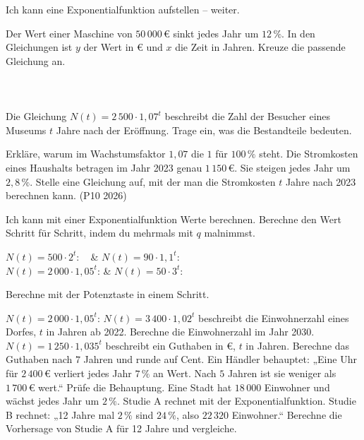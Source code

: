 \begin{aufgabe}{Ich kann eine Exponentialfunktion aufstellen – weiter.}
\begin{teile}
\teil Der Wert einer Maschine von $50\,000\,€$ sinkt jedes Jahr um $12\,\%$. In den Gleichungen ist $y$ der Wert in € und $x$ die Zeit in Jahren. Kreuze die passende Gleichung an. \\
 \\
 \\
 \\
\teil Die Gleichung $N(t) = 2\,500 \cdot 1{,}07^t$ beschreibt die Zahl der Besucher eines Museums $t$ Jahre nach der Eröffnung. Trage ein, was die Bestandteile bedeuten.
\end{teile}
\begin{teile}
\teil Erkläre, warum im Wachstumsfaktor $1{,}07$ die $1$ für $100\,\%$ steht.
\teil Die Stromkosten eines Haushalts betragen im Jahr 2023 genau $1\,150\,€$. Sie steigen jedes Jahr um $2{,}8\,\%$. Stelle eine Gleichung auf, mit der man die Stromkosten $t$ Jahre nach 2023 berechnen kann. (P10 2026)
\end{teile}
\end{aufgabe}

\begin{aufgabe}{Ich kann mit einer Exponentialfunktion Werte berechnen. Berechne den Wert Schritt für Schritt, indem du mehrmals mit $q$ malnimmst.}
\begin{teilezwei}
\tz $N(t) = 500 \cdot 2^t$: \  & \tz $N(t) = 90 \cdot 1{,}1^t$: \  \\
\tz $N(t) = 2\,000 \cdot 1{,}05^t$:  & \tz $N(t) = 50 \cdot 3^t$: \  \\
\end{teilezwei}
Berechne mit der Potenztaste in einem Schritt.
\begin{teile}
\teil $N(t) = 2\,000 \cdot 1{,}05^t$: \quad {}
\teil $N(t) = 3\,400 \cdot 1{,}02^t$ beschreibt die Einwohnerzahl eines Dorfes, $t$ in Jahren ab 2022. Berechne die Einwohnerzahl im Jahr 2030. \quad \leerfeld
\teil $N(t) = 1\,250 \cdot 1{,}035^t$ beschreibt ein Guthaben in €, $t$ in Jahren. Berechne das Guthaben nach $7$ Jahren und runde auf Cent. \quad \leerfeld[€]
\teil Ein Händler behauptet: „Eine Uhr für $2\,400\,€$ verliert jedes Jahr $7\,\%$ an Wert. Nach $5$ Jahren ist sie weniger als $1\,700\,€$ wert.“ Prüfe die Behauptung.
\teil Eine Stadt hat $18\,000$ Einwohner und wächst jedes Jahr um $2\,\%$. Studie A rechnet mit der Exponentialfunktion. Studie B rechnet: „12 Jahre mal $2\,\%$ sind $24\,\%$, also $22\,320$ Einwohner.“ Berechne die Vorhersage von Studie A für 12 Jahre und vergleiche.
\end{teile}
\end{aufgabe}

